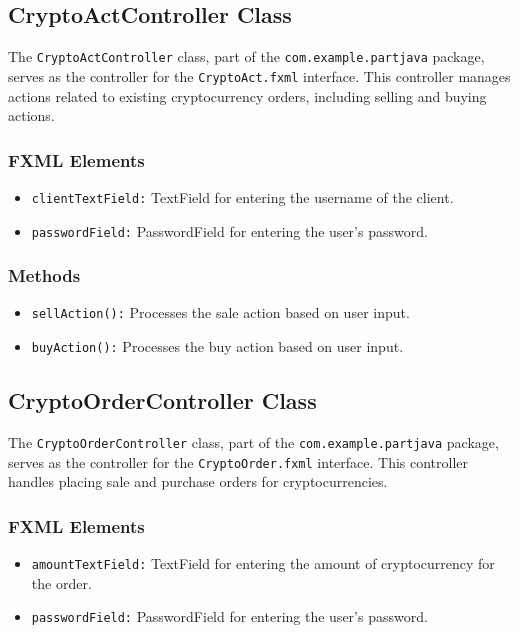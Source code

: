 \documentclass{article}
\begin{document}
\subsection*{CryptoActController Class}

The \texttt{CryptoActController} class, part of the \texttt{com.example.partjava} package, serves as the controller for the \texttt{CryptoAct.fxml} interface. This controller manages actions related to existing cryptocurrency orders, including selling and buying actions.

\subsubsection*{FXML Elements}

\begin{itemize}
    \item \texttt{clientTextField:} TextField for entering the username of the client.
    \item \texttt{passwordField:} PasswordField for entering the user's password.
\end{itemize}

\subsubsection*{Methods}

\begin{itemize}
    \item \texttt{sellAction():} Processes the sale action based on user input.
    \item \texttt{buyAction():} Processes the buy action based on user input.
\end{itemize}

\subsection*{CryptoOrderController Class}

The \texttt{CryptoOrderController} class, part of the \texttt{com.example.partjava} package, serves as the controller for the \texttt{CryptoOrder.fxml} interface. This controller handles placing sale and purchase orders for cryptocurrencies.

\subsubsection*{FXML Elements}

\begin{itemize}
    \item \texttt{amountTextField:} TextField for entering the amount of cryptocurrency for the order.
    \item \texttt{passwordField:} PasswordField for entering the user's password.
\end{itemize}
\end{document}
